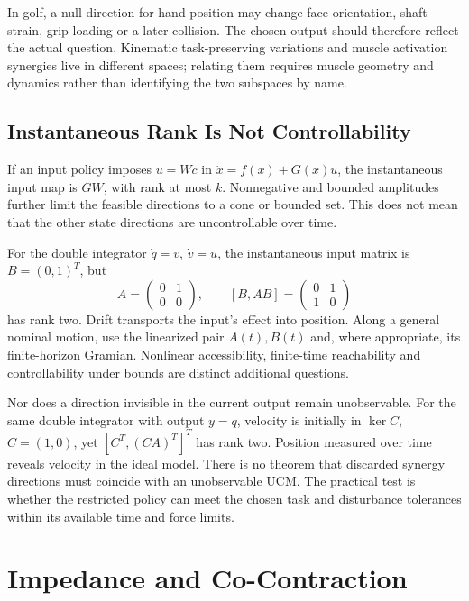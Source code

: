 In golf, a null direction for hand position may change face orientation, shaft
strain, grip loading or a later collision. The chosen output should therefore
reflect the actual question. Kinematic task-preserving variations and muscle
activation synergies live in different spaces; relating them requires muscle
geometry and dynamics rather than identifying the two subspaces by name.

\subsection{Instantaneous Rank Is Not Controllability}

If an input policy imposes $u=Wc$ in $\dot x=f(x)+G(x)u$, the instantaneous
input map is $GW$, with rank at most $k$. Nonnegative and bounded amplitudes
further limit the feasible directions to a cone or bounded set. This does not
mean that the other state directions are uncontrollable over time.

For the double integrator $\dot q=v$, $\dot v=u$, the instantaneous input
matrix is $B=(0,1)^T$, but
\begin{equation}
A=\begin{pmatrix}0&1\\0&0\end{pmatrix},\qquad
[B,AB]=\begin{pmatrix}0&1\\1&0\end{pmatrix}
\label{eq:ch8:controllability-example}
\end{equation}
has rank two. Drift transports the input's effect into position. Along a
general nominal motion, use the linearized pair $A(t),B(t)$ and, where
appropriate, its finite-horizon Gramian. Nonlinear accessibility, finite-time
reachability and controllability under bounds are distinct additional questions.

Nor does a direction invisible in the current output remain unobservable.
For the same double integrator with output $y=q$, velocity is initially in
$\ker C$, $C=(1,0)$, yet $[C^T,(CA)^T]^T$ has rank two. Position measured over
time reveals velocity in the ideal model. There is no theorem that discarded
synergy directions must coincide with an unobservable UCM. The practical test
is whether the restricted policy can meet the chosen task and disturbance
tolerances within its available time and force limits.

\section{Impedance and Co-Contraction}

